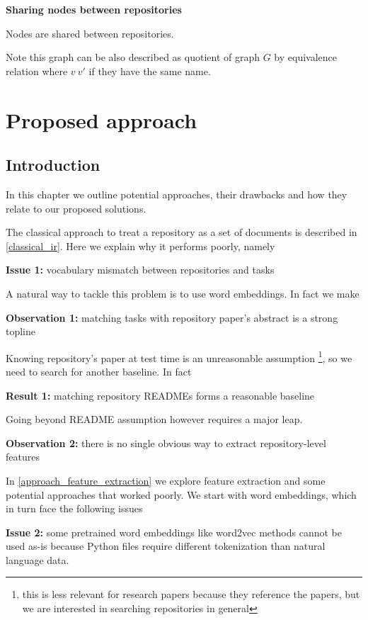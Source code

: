 \documentclass[longabstract,mgr,english]{iithesis}
\begin{document}
\textbf{Sharing nodes between repositories}

Nodes are shared between repositories.

Note this graph can be also described as quotient of graph $G$ by equivalence relation where $v ~ v'$ if they have the same name.

\chapter{Proposed approach}

\section{Introduction}

In this chapter we outline potential approaches, their drawbacks and how they
relate to our proposed solutions.

The classical approach to treat a repository as a set of documents is described in
\ref{classical_ir}. Here we explain why it performs poorly, namely

\textbf{Issue 1:} vocabulary mismatch between repositories and tasks

A natural way to tackle this problem is to use word embeddings. In fact we make

\textbf{Observation 1:} matching tasks with repository paper's abstract is a strong topline 

Knowing repository's paper at test time is an unreasonable assumption \footnote{this is less relevant for research papers because they reference the papers, but we are interested in searching repositories in general}, so we
need to search for another baseline. In fact

\textbf{Result 1:} matching repository READMEs forms a reasonable baseline

Going beyond README assumption however requires a major leap. 

\textbf{Observation 2:} there is no single obvious way to extract repository-level features 

In \ref{approach_feature_extraction} we explore feature extraction and
some potential approaches that worked poorly. We start with word
embeddings, which in turn face the following issues

\textbf{Issue 2:}\label{word_embedding_tokenization} some pretrained word embeddings like word2vec methods cannot be used as-is because Python files require different tokenization than natural language data.
\end{document}

